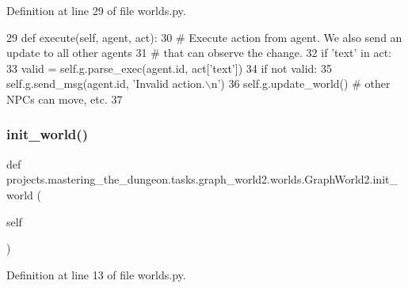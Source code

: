 Definition at line 29 of file worlds.\+py.


\begin{DoxyCode}
29     \textcolor{keyword}{def }execute(self, agent, act):
30         \textcolor{comment}{# Execute action from agent. We also send an update to all other agents}
31         \textcolor{comment}{# that can observe the change.}
32         \textcolor{keywordflow}{if} \textcolor{stringliteral}{'text'} \textcolor{keywordflow}{in} act:
33             valid = self.g.parse\_exec(agent.id, act[\textcolor{stringliteral}{'text'}])
34             \textcolor{keywordflow}{if} \textcolor{keywordflow}{not} valid:
35                 self.g.send\_msg(agent.id, \textcolor{stringliteral}{'Invalid action.\(\backslash\)n'})
36         self.g.update\_world()  \textcolor{comment}{# other NPCs can move, etc.}
37 \end{DoxyCode}
\mbox{\label{classprojects_1_1mastering__the__dungeon_1_1tasks_1_1graph__world2_1_1worlds_1_1GraphWorld2_a5a0c4a11d2e572bfbe476f9c5d3fbf03}} 
\subsubsection{\texorpdfstring{init\+\_\+world()}{init\_world()}}
{\footnotesize\ttfamily def projects.\+mastering\+\_\+the\+\_\+dungeon.\+tasks.\+graph\+\_\+world2.\+worlds.\+Graph\+World2.\+init\+\_\+world (\begin{DoxyParamCaption}\item[{}]{self }\end{DoxyParamCaption})}



Definition at line 13 of file worlds.\+py.


